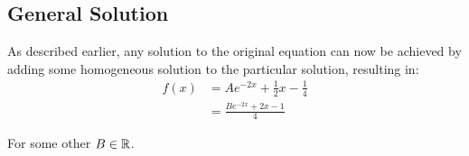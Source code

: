 \subsection*{General Solution}

    As described earlier, any solution to the original equation can now be achieved by adding some homogeneous solution to the particular solution, resulting in:
    \begin{align}
        f(x) &= A e^{-2x} + \frac{1}{2} x - \frac{1}{4} \nonumber\\
        &= \frac{B e^{-2x} + 2x - 1}{4} \label{eq:general}
    \end{align}

    For some other $B \in \operatorname{\mathbb{R}}$.
